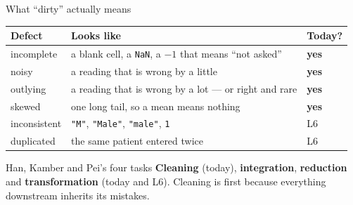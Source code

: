 \documentclass[aspectratio=169]{beamer}
\begin{document}
\begin{frame}[shrink=6]{What ``dirty'' actually means}
  \begin{center}\small
  \begin{tabular}{@{}lp{5.6cm}l@{}}
    \toprule
    \textbf{Defect} & \textbf{Looks like} & \textbf{Today?}\\
    \midrule
    incomplete & a blank cell, a \texttt{NaN}, a $-1$ that means
      ``not asked'' & \textbf{yes}\\
    noisy      & a reading that is wrong by a little & \textbf{yes}\\
    outlying   & a reading that is wrong by a lot --- or right and rare &
      \textbf{yes}\\
    skewed     & one long tail, so a mean means nothing & \textbf{yes}\\
    inconsistent & \texttt{"M"}, \texttt{"Male"}, \texttt{"male"}, \texttt{1} &
      L6\\
    duplicated & the same patient entered twice & L6\\
    \bottomrule
  \end{tabular}
  \end{center}
  \vspace{0.3em}
  \begin{exampleblock}{Han, Kamber and Pei's four tasks}
    \small \textbf{Cleaning} (today), \textbf{integration}, \textbf{reduction}
    and \textbf{transformation} (today and L6). Cleaning is first because
    everything downstream inherits its mistakes.
  \end{exampleblock}
\end{frame}
\end{document}
